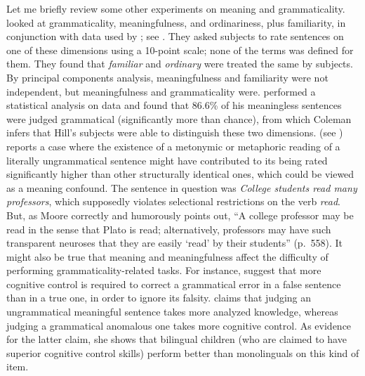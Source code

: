 Let me  briefly review some other experiments on meaning and grammaticality. \citet{DanksEtAl1970} looked at grammaticality, meaningfulness, and ordinariness, plus familiarity, in conjunction with data used by \citet{Coleman1965};
see . They asked subjects to rate sentences on one of these dimensions using a 10-point scale; none of the terms was defined for them. They found that \textit{familiar} and \textit{ordinary} were treated the same by subjects. By principal
components analysis, meaningfulness and familiarity were not independent, but meaningfulness and grammaticality were. \citet{Coleman1965} performed a statistical analysis on  data and found that 86.6\% of his meaningless sentences were judged grammatical (significantly more than chance), from which Coleman infers that Hill's subjects were able to distinguish these two dimensions. \citet{Moore1972} (see ) reports a case where the existence of a metonymic or metaphoric reading of a literally ungrammatical sentence might have contributed to its being rated significantly higher than other structurally identical ones, which could be viewed as a meaning confound. The sentence in question was \textit{College students read many professors}, which supposedly violates selectional restrictions on the verb \textit{read}. But, as Moore correctly and humorously points out, ``A college professor may be read in the sense that Plato is read; alternatively, professors may have such transparent neuroses that they are easily `read' by their students'' (p.~558). It might also be true that meaning and meaningfulness affect the difficulty of performing grammaticality-related tasks. For instance, \citet{RyanEtAl1984} suggest that more cognitive control is required to correct a grammatical error in a false sentence than in a true one, in order to ignore its falsity. \citet{Bialystok1986} claims that judging an ungrammatical meaningful sentence takes more analyzed knowledge, whereas judging a grammatical anomalous one takes more cognitive control.  As evidence for the latter claim, she shows that bilingual children (who are claimed to have superior cognitive control skills) perform better than monolinguals on this kind of item.

